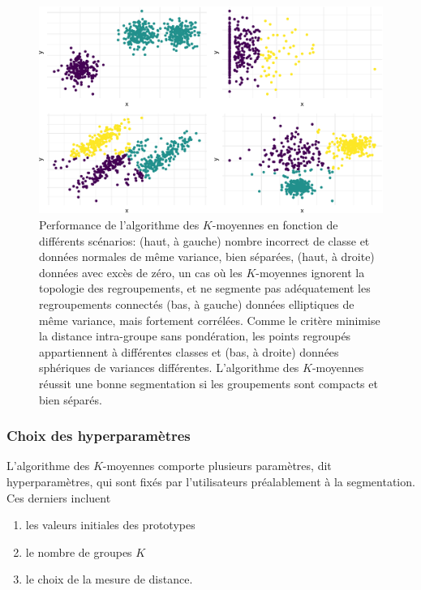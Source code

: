 \documentclass[
  11pt,
  letterpaper,
]{book}
\providecommand{\tightlist}{%
  \setlength{\itemsep}{0pt}\setlength{\parskip}{0pt}}\usepackage{longtable,booktabs,array}
\theoremstyle{definition}
\theoremstyle{remark}
\begin{document}
\begin{figure}[ht!]

{\centering \includegraphics[width=1\textwidth,height=\textheight]{./03-regroupements_files/figure-pdf/kmoyperfo-1.pdf}

}

\caption{Performance de l'algorithme des \(K\)-moyennes en fonction de
différents scénarios: (haut, à gauche) nombre incorrect de classe et
données normales de même variance, bien séparées, (haut, à droite)
données avec excès de zéro, un cas où les \(K\)-moyennes ignorent la
topologie des regroupements, et ne segmente pas adéquatement les
regroupements connectés (bas, à gauche) données elliptiques de même
variance, mais fortement corrélées. Comme le critère minimise la
distance intra-groupe sans pondération, les points regroupés
appartiennent à différentes classes et (bas, à droite) données
sphériques de variances différentes. L'algorithme des \(K\)-moyennes
réussit une bonne segmentation si les groupements sont compacts et bien
séparés.}

\end{figure}

\hypertarget{choix-des-hyperparamuxe8tres}{%
\subsubsection*{Choix des
hyperparamètres}\label{choix-des-hyperparamuxe8tres}}

L'algorithme des \(K\)-moyennes comporte plusieurs paramètres, dit
hyperparamètres, qui sont fixés par l'utilisateurs préalablement à la
segmentation. Ces derniers incluent

\begin{enumerate}
\def\labelenumi{\arabic{enumi}.}
\tightlist
\item
  les valeurs initiales des prototypes
\item
  le nombre de groupes \(K\)
\item
  le choix de la mesure de distance.
\end{enumerate}
\end{document}

